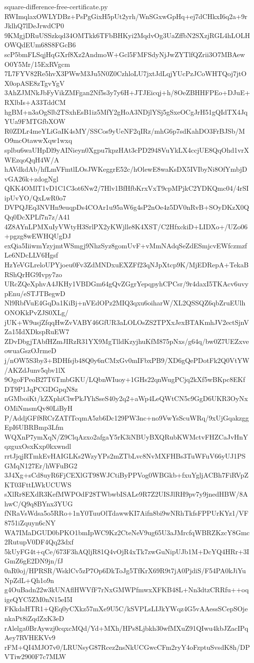 \documentclass[11pt]{article}
\theoremstyle{definition}
\theoremstyle{remark}
\begin{document}
\begin{filecontents*}[overwrite]{square-difference-free-certificate.py}
RWImqlaxOWLYDBz+PsPgGixH5pUt2yrh/WnSGxwGpHq+ej7dCHkxI6q2a+9rJklhQ7lDeJrwdCP0
9KMgjDRuUSSzkqd34OMTkk6TFbBHKyi2MqdvOg3UaZffbN2SXzjRGL4hLOLHOWQdEUm68S8FGcB6
scP5bmFLSqjHqGXrf8Xz2AndmoW+Gcl5FMFSdyNjJwZYTlfQZrii3O7MBAewO0Y5Mr/15ExRVgcm
7L7FYV82Re5hvX3PWwM3Ju5N0Z0CzhloLU7jxtJdLqjYUcPzJCoWHTQoj7jtOX0opASE8zTgvYgV
3AhZJMNkJbFyVikZMFgan2Nf5s3y7y6H+JTJEicqj+h/8OeZBHHFPEo+DJuE+RXlbIs+A33TddCM
hgBM+n3aOgSlb2TSxhEsB1iz5MfY2gHoA3NDjlYSj5gSxeOCgJrH51gQIdTX4JqYUa9FMTGfbXOW
R0ZDLr4meYLiGaIK4sMY/SSCos9yUeNF2qIRz/mhG6p7sdKahDO3FrBJSb/MO9mcOtawwXqw1wxq
splbu6waUHpDl9yAINieyn0Xgpu7kpzHAt3cPD2948VuYkLX4ccjUE8QqOhd1vrXWEzqoQqH4W/A
hAVdkdAb/hfLmVFmtlLOsJWKeggrE52c/hOlewE8waKsDX5IVIbyNi8OfYmbjDvGA26k+zdogNgl
QKK4OMlT1vD1C1C3ot6Nw2/7Hlv1BfHfbKrxVxT9cpMPjkC2YDKQmc04/4rSIipUvYO/QxLwR0o7
DVPQJEq3NVHn9euqpDs4COAr1u95aW6g4sP2nOe4z5DV0nRvB+SOyDKzX0QQq0DcXPLf7n7z/A41
4Z8AYnLPMXuIyVWtyH3SrlPX2yKWjlle8K4XST/C2HfxckiD+LIDXo+/UZo06+pgzg8wEWHQUgDJ
exQia5IiiwmYzyjmtWSmgj9NhzSyz8gomUvF+vMmNAdqSeZdESmjcvEWfczmzfLe6NDcLLV6Hgsf
HzYeVGLreloUPYjoeu0Fv3ZdMNDxuEXZFf23qNJpXtcp9K/MjEDRepA+TekaBRShQrHG9Ivpy7zo
URcZQeXphvA4JKHy1VBDGm64gQvZGgrYepqpyhCPCsr/9r4daxI5TKAcv6uvypEnu/eSTJTBegwD
Nl9RbfVuE4GqDa1KiBj+nVEdOPz2MIQ3qxu6oiharW/XL2QSSQZ6qbZruEUlhONOKkPvZJS0XLg/
jUK+W9usjZfqqHwZvVABY46GfUR3aLOLOsZS2TPXxJexBTAKmhJV2ectSjnVZa15IdXDkspRuEW7
ZDvDbgjTAbfHZmJIRzR31YX9MgTlldKzyjhuKfM875pNxs/g64q/bw0Z7UEZxveowuaGszOJrmeD
j/nOW5S3by3+BDHfsjb48Q0y6nCMxGv0mIFbxPB9/XD6gQePDotFk2Q0VtYW/AKZdJunv5qbv1lX
9OgoFPeoB27T6TmbGKU/LQbnWIuoy+1GHs22qnWugPCjq2kXf5wBKpc8EKfDT9P1JqPCGDGpqN8z
nGMboiKt/kZXphiClwPkJYhSseS40y2q2+aWp4LeQWtCN5c9GgD6UKR3OyNxOMiNmsmQv80LiByH
P/AddjGFf8RCrZATfTcqmA5zb6Dc129PW3nc+no9VwYsScuWRq/9xUjGqakzggEpI6UBRBmp3Lfm
WQXnP7ymXqN/Z9ClqAzxo2afgaY5rK3iNBUyBXQRubKWMctvFHZCaJvHnYqzguxOsxKxp0kxwndl
rrtJjqjRTmkEvHAIGLKs2WzyYPs2mZTbLvc8NvMXFHBs3TuWFuV66yUJ1PSGMqN127Er/hWFuBG2
3J4Xg+sCd8uyR6FjCEXlGT98WJCtiByPPVog0WBGkb+fxuYgljACBh7FiRVpZKT03FttLWkUCUWS
sXlRr8EXdR3KefMWPOdF28TWbwbISALe9R7Z2UISJlRH9pv7y9jnedHBW/8AhwC/Q9q8BYnx3YUG
fNRaVsWdsa5o5RRo+1nY0TuuOlTdawwKI7Aifn8bi9wNRhTkfsFPPUrKYz1/VF8751iZquyn6cNY
WA7IMaDGUD0bPKO1bmIpWC9Kz2CteNeV9ug65U3aJMrcfqWBRZKzcY8Gmc2RutupV0DF4Qq23dxf
5kUyFG4t+qCe/673F3hAQljR81Q4vOjR4xTk7zwGuNipUJb1M+DcYQ4HRr+3IGmZ6gE2DN9jn/fJ
0aR0oj/HPRSR/WsklCv5zP7Op6DkToJg5TfKrX69R9t7jA0PjdiS/F54PA0kJiYuNpZdL+Qh1o9n
g4OuBadn22w3kUNAflHWVfF7rNxGMWPfmwxXFKB48L+Nn3dtzCRRfu++oqigeQYC5ZM0nN15eI5I
FKkdaHTR1+QEq0yCXkz57mXe9U5C/kSVPLsLIJkYWqz4G5vAAessSCepSOjenkaPt8iZqdZxK3eD
rAlelga0BrAywzj0cqxcMQd/Yd+MXh/HPs8Ljbkh30wfMXuZ91QIwu4kbJZacIPqAey7RVHEKVv9
rFM+QI4MJO7v0/LRUNsyG87Rcez2nsNkUCGwcCFm2ryY4oFzptuSvsdK8h/DPVTiw2900F7c7MLW

\end{filecontents*}
\end{document}
